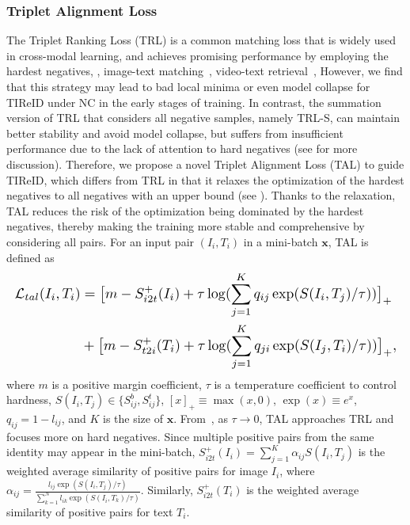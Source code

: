 \documentclass[10pt,twocolumn,letterpaper]{article}
\begin{document}
\subsubsection{Triplet Alignment Loss}
The Triplet Ranking Loss (TRL) is a common matching loss that is widely used in cross-modal learning, and achieves promising performance by employing the hardest negatives, \eg, image-text matching~\cite{diao2021similarity}, video-text retrieval~\cite{dong2021dual}, \etc However, we find that this strategy may lead to bad local minima or even model collapse for TIReID under NC in the early stages of training. In contrast, the summation version of TRL that considers all negative samples, namely TRL-S, can maintain better stability and avoid model collapse, but suffers from insufficient performance due to the lack of attention to hard negatives (see  for more discussion). Therefore, we propose a novel Triplet Alignment Loss (TAL) to guide TIReID, which differs from TRL in that it relaxes the optimization of the hardest negatives to all negatives with an upper bound (see ). Thanks to the relaxation, TAL reduces the risk of the optimization being dominated by the hardest negatives, thereby making the training more stable and comprehensive by considering all pairs. For an input pair $(I_i,T_i)$ in a mini-batch $\mathbf{x}$, TAL is defined as
\begin{equation}
 \resizebox{\linewidth}{!}{$
    \begin{aligned}
        \mathcal{L}_{tal}(I_i,T_i)&=\big[ m -  S^+_{i2t}(I_i) + \tau \log ( \sum_{j = 1}^K q_{ij}\exp(S(I_i,T_j)/\tau)  ) \big]_+\\ &+\big[ m -  S^+_{t2i}(T_i)  + \tau \log ( \sum_{j = 1}^K q_{ji}\exp(S(I_j,T_i)/\tau)  ) \big]_+,
    \end{aligned}$}
    \label{eqtal}
\end{equation}
where $m$ is a positive margin coefficient, $\tau$ is a temperature coefficient to control hardness, $S(I_i,T_j)\in \{S_{ij}^b, S_{ij}^t\}$, $[x]_+ \equiv \max (x,0)$, $\exp(x)\equiv e^x$, $q_{ij}=1-l_{ij}$,  and $K$ is the size of $\mathbf{x}$. From~, as $\tau\to0$, TAL approaches TRL and focuses more on hard negatives. Since multiple positive pairs from the same identity may appear in the mini-batch, $S^+_{i2t}(I_i) =\sum^K_{j=1} \alpha_{ij}  S(I_i,T_j)$ is the weighted average similarity of positive pairs for image $I_i$, where $\alpha_{ij}=\frac{l_{ij}\exp{(S(I_i,T_j)/\tau)}}{\sum^N_{k=1}l_{ik}\exp{(S(I_i,T_k)/\tau)}}$. Similarly, $S^+_{i2t}(T_i)$ is the weighted average similarity of positive pairs for text $T_i$.
\end{document}
